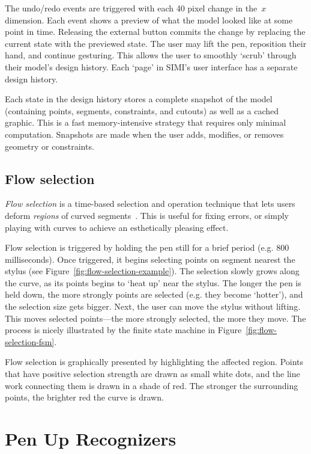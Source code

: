 The undo/redo events are triggered with each 40 pixel change in
the~$x$ dimension. Each event shows a preview of what the model looked
like at some point in time. Releasing the external button commits the
change by replacing the current state with the previewed state. The
user may lift the pen, reposition their hand, and continue
gesturing. This allows the user to smoothly `scrub' through their
model's design history. Each `page' in SIMI's user interface has a
separate design history.

Each state in the design history stores a complete snapshot of the
model (containing points, segments, constraints, and cutouts) as well
as a cached graphic. This is a fast memory-intensive strategy that
requires only minimal computation. Snapshots are made when the user
adds, modifies, or removes geometry or constraints.

\subsection{Flow selection}



\textit{Flow selection} is a time-based selection and operation
technique that lets users deform \textit{regions} of curved
segments~\cite{johnson-flow-selection}. This is useful for fixing
errors, or simply playing with curves to achieve an esthetically
pleasing effect.

Flow selection is triggered by holding the pen still for a brief
period (e.g. 800 milliseconds). Once triggered, it begins selecting
points on segment nearest the stylus (see
Figure~\ref{fig:flow-selection-example}). The selection slowly grows
along the curve, as its points begins to `heat up' near the
stylus. The longer the pen is held down, the more strongly points are
selected (e.g. they become `hotter'), and the selection size gets
bigger. Next, the user can move the stylus without lifting. This moves
selected points---the more strongly selected, the more they move. The
process is nicely illustrated by the finite state machine in
Figure~\ref{fig:flow-selection-fsm}.

Flow selection is graphically presented by highlighting the affected
region. Points that have positive selection strength are drawn as
small white dots, and the line work connecting them is drawn in a shade
of red. The stronger the surrounding points, the brighter red the
curve is drawn.

\section{Pen Up Recognizers}


